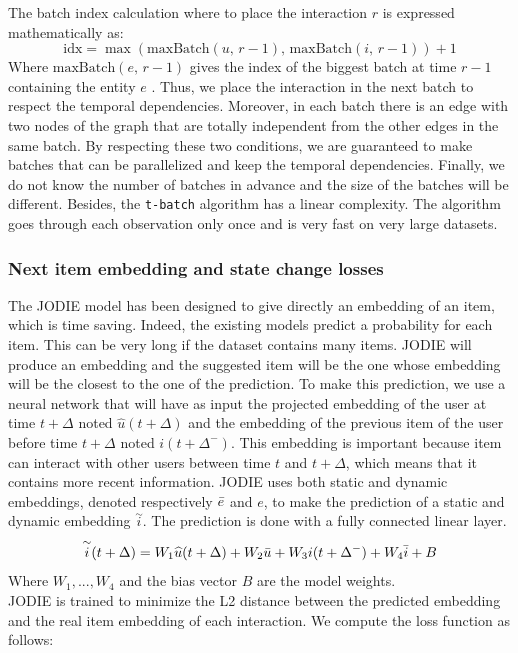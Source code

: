 The batch index calculation where to place the interaction $r$ is expressed mathematically as:
$$
\text{idx} = \max \left ( \text{maxBatch}(u, \,r-1), \,\text{maxBatch}(i, \,r-1) \right ) + 1
$$
Where $\text{maxBatch}(e, \,r-1)$ gives the index of the biggest batch at time $r-1$ containing the entity $e$ . Thus, we place the interaction in the next batch to respect the temporal dependencies. Moreover, in each batch there is an edge with two nodes of the graph that are totally independent from the other edges in the same batch. By respecting these two conditions, we are guaranteed to make batches that can be parallelized and keep the temporal dependencies. Finally, we do not know the number of batches in advance and the size of the batches will be different. Besides, the \texttt{t-batch} algorithm has a linear complexity. The algorithm goes through each observation only once and is very fast on very large datasets.

\subsubsection{Next item embedding and state change losses}

The JODIE model has been designed to give directly an embedding of an item, which is time saving. Indeed, the existing models predict a probability for each item. This can be very long if the dataset contains many items. JODIE will produce an embedding and the suggested item will be the one whose embedding will be the closest to the one of the prediction. To make this prediction, we use a neural network that will have as input the projected embedding of the user at time $t+\Delta$ noted $\widehat u(t+\Delta)$ and the embedding of the previous item of the user before time $t+\Delta$ noted $i(t+\Delta^-)$. This embedding is important because item can interact with other users between time $t$ and $t+\Delta$, which means that it contains more recent information. JODIE uses both static and dynamic embeddings, denoted respectively $\Bar{e}$ and $e$, to make the prediction of a static and dynamic embedding $\overset{\sim}{i}$. The prediction is done with a fully connected linear layer.
$$
\overset{\sim}{i} (t+\Delta) = W_1 \widehat u(t+\Delta) + W_2 \Bar{u} + W_3 i(t+\Delta^-) + W_4 \Bar{i} + B
$$
Where $W_1, ..., W_4$ and the bias vector $B$ are the model weights.\\

JODIE is trained to minimize the L2 distance between the predicted embedding and the real item embedding of each interaction. We compute the loss function as follows:

